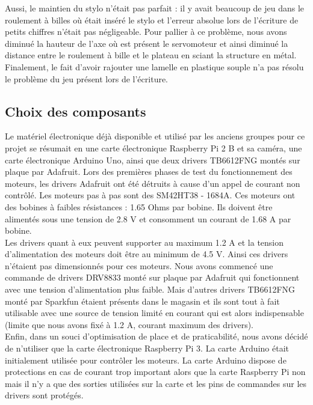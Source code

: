 \documentclass[12pt]{article}
\begin{document}
\noindent
Aussi, le maintien du stylo n'était pas parfait : il y avait beaucoup de jeu dans le roulement à billes où était inséré le stylo et l'erreur absolue lors de l'écriture de petits chiffres n'était pas négligeable. Pour pallier à ce problème, nous avons diminué la hauteur de l'axe où est présent le servomoteur et ainsi diminué la distance entre le roulement à bille et le plateau en sciant la structure en métal. Finalement, le fait d'avoir rajouter une lamelle en plastique souple n'a pas résolu le problème du jeu présent lors de l'écriture. 

\subsection{Choix des composants}

Le matériel électronique déjà disponible et utilisé par les anciens groupes pour ce projet se résumait en une carte électronique Raspberry Pi 2 B et sa caméra, une carte électronique Arduino Uno, ainsi que deux drivers TB6612FNG montés sur plaque par Adafruit. Lors des premières phases de test du fonctionnement des moteurs, les drivers Adafruit ont été détruits à cause d'un appel de courant non contrôlé. Les moteurs pas à pas sont des SM42HT38 - 1684A. Ces moteurs ont des bobines à faibles résistances : 1.65 Ohms par bobine. Ils doivent être alimentés sous une tension de 2.8 V et consomment un courant de 1.68 A par bobine.\\

\noindent
Les drivers quant à eux peuvent supporter au maximum 1.2 A et la tension d'alimentation des moteurs doit être au minimum de 4.5 V. Ainsi ces drivers n'étaient pas dimensionnés pour ces moteurs. Nous avons commencé une commande de drivers DRV8833 monté sur plaque par Adafruit qui fonctionnent avec une tension d'alimentation plus faible. Mais d'autres drivers TB6612FNG monté par Sparkfun étaient présents dans le magasin et ils sont tout à fait utilisable avec une source de tension limité en courant qui est alors indispensable (limite que nous avons fixé à 1.2 A, courant maximum des drivers).\\

\noindent
Enfin, dans un souci d'optimisation de place et de praticabilité, nous avons décidé de n'utiliser que la carte électronique Raspberry Pi 3. La carte Arduino était initialement utilisée pour contrôler les moteurs. La carte Arduino dispose de protections en cas de courant trop important alors que la carte Raspberry Pi non mais il n'y a que des sorties utilisées sur la carte et les pins de commandes sur les drivers sont protégés.
\end{document}
